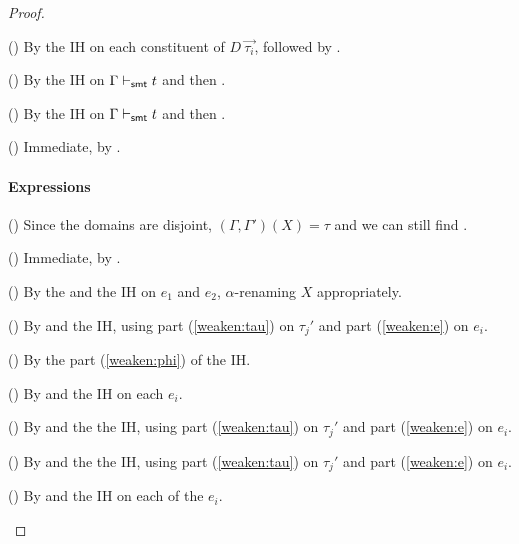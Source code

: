\documentclass[acmsmall,screen,nonacm]{acmart}
\theoremstyle{definition}
\begin{document}
\begin{lemma}[Weakening]
\begin{proof}
\begin{proofcases}
  \item[(\rn{$t$-ADT})] By the IH on each constituent of $D
  ~ \vec{\tau_i}$, followed by .

  \item[(\rn{$\tau$-SMT})] By the IH on $\Gamma \vdash_{\mathsf{smt}} t$ and
  then .

  \item[(\rn{$\tau$-Sym})] By the IH on $\Gamma \vdash_{\mathsf{smt}} t$ and
  then .

  \item[(\rn{$\tau$-Model})] Immediate, by .
%
  \qedhere

\end{proofcases}

\paragraph*{Expressions}
%
\begin{proofcases}

  \item[(\rn{$e$-Var})] Since the domains are disjoint,
  $(\Gamma,\Gamma')(X) = \tau$ and we can still find .

  \item[(\rn{$e$-Const})] Immediate, by .

  \item[(\rn{$e$-Let})] By the  and the IH on $e_1$ and
  $e_2$, $\alpha$-renaming $X$ appropriately.

  \item[(\rn{$e$-Ctor})] By  and the IH, using part
  (\ref{weaken:tau}) on $\tau_j'$ and part (\ref{weaken:e}) on
  $e_i$.

  \item[(\rn{$e$-Quote})] By the part (\ref{weaken:phi}) of the IH.

  \item[(\rn{$e$-Rel})] By  and the IH on each $e_i$.

  \item[(\rn{$e$-Fun})] By  and the the IH, using part
  (\ref{weaken:tau}) on $\tau_j'$ and part (\ref{weaken:e}) on
  $e_i$.

  \item[(\rn{$e$-Op})] By  and the the IH, using part
  (\ref{weaken:tau}) on $\tau_j'$ and part (\ref{weaken:e}) on
  $e_i$.

  \item[(\rn{$e$-If})] By  and the IH on each of the $e_i$.


\end{proofcases}
\end{proof}
\end{lemma}
\end{document}
